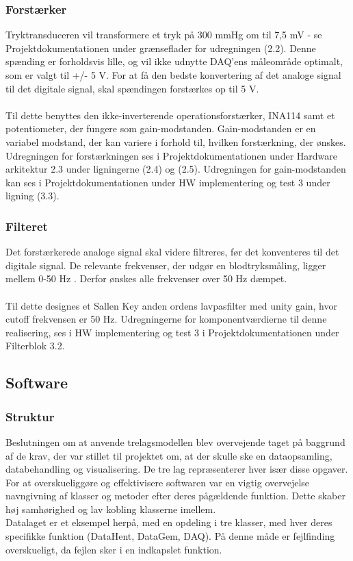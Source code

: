 \subsubsection{Forstærker}
Tryktransduceren vil transformere et tryk på 300 mmHg om til 7,5 mV - se Projektdokumentationen under grænseflader for udregningen (2.2). Denne spænding er forholdsvis lille, og vil ikke udnytte DAQ'ens måleområde optimalt, som er valgt til +/- 5 V. For at få den bedste konvertering af det analoge signal til det digitale signal, skal spændingen forstærkes op til 5 V. 
\\\\
Til dette benyttes den ikke-inverterende operationsforstærker, INA114 samt et potentiometer, der fungere som gain-modstanden. Gain-modstanden er en variabel modstand, der kan variere i forhold til, hvilken forstærkning, der ønskes. Udregningen for forstærkningen ses i Projektdokumentationen under Hardware arkitektur 2.3 under ligningerne (2.4) og (2.5). Udregningen for gain-modstanden kan ses i Projektdokumentationen under HW implementering og test 3 under ligning (3.3).     

\subsubsection{Filteret}
Det forstærkerede analoge signal skal videre filtreres, før det konventeres til det digitale signal. De relevante frekvenser, der udgør en blodtryksmåling, ligger mellem 0-50 Hz \cite[s. 10]{Billed for invasiv blodtryksmaling}. Derfor ønskes alle frekvenser over 50 Hz dæmpet.
\\\\
Til dette designes et Sallen Key anden ordens lavpasfilter med unity gain, hvor cutoff frekvensen er 50 Hz. Udregningerne for komponentværdierne til denne realisering, ses i HW implementering og test 3 i Projektdokumentationen under Filterblok 3.2.

\subsection{Software}
 
\subsubsection{Struktur}
Beslutningen om at anvende trelagsmodellen blev overvejende taget på baggrund af de krav, der var stillet til projektet om, at der skulle ske en dataopsamling, databehandling og visualisering. De tre lag repræsenterer hver især disse opgaver. 
For at overskueliggøre og effektivisere softwaren var en vigtig overvejelse navngivning af klasser og metoder efter deres pågældende funktion. Dette skaber høj samhørighed og lav kobling klasserne imellem.\\
Datalaget er et eksempel herpå, med en opdeling i tre klasser, med hver deres specifikke funktion (DataHent, DataGem, DAQ). På denne måde er fejlfinding overskueligt, da fejlen sker i en indkapslet funktion.

